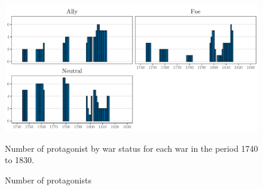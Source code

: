 \documentclass[12pt,a4paper,notitlepage,english]{article}
\newcommand{\fontsmall}{\fontsize{10pt}{12pt}\selectfont}
\begin{document}
\pagebreak

\renewcommand{\baselinestretch}{1.0}\normalsize




\clearpage


\begin{appendix}


\renewcommand\thefigure{A\arabic{figure}}  
\setcounter{figure}{0}   

\begin{center}
\begin{figure}[h!]
\caption{Number of protagonists}
\label{fig:number_of_protagonist}
\centering
\includegraphics[scale=.18]{Number_of_protagonist}
\begin{minipage}{.9\textwidth}
\begin{flushleft}
\fontsmall
Number of protagonist by war status for each war in the period 1740 to 1830.
\end{flushleft}
\end{minipage}
\end{figure}
\end{center}






\end{appendix}
\end{document}
